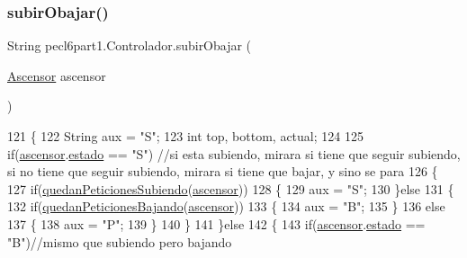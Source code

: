 \subsubsection{\texorpdfstring{subir\+Obajar()}{subirObajar()}}
{\footnotesize\ttfamily String pecl6part1.\+Controlador.\+subir\+Obajar (\begin{DoxyParamCaption}\item[{\mbox{\hyperlink{classpecl6part1_1_1_ascensor}{Ascensor}}}]{ascensor }\end{DoxyParamCaption})\hspace{0.3cm}{\ttfamily [inline]}}


\begin{DoxyCode}
121     \{
122         String aux = \textcolor{stringliteral}{"S"};
123         \textcolor{keywordtype}{int} top, bottom, actual;
124         
125         \textcolor{keywordflow}{if}(\mbox{\hyperlink{classpecl6part1_1_1_controlador_ab1a946290b47216d355b09da476486db}{ascensor}}.\mbox{\hyperlink{classpecl6part1_1_1_ascensor_ad892045a12a5bfbd5b352fede74a1d0f}{estado}} == \textcolor{stringliteral}{"S"})      \textcolor{comment}{//si esta subiendo, mirara si tiene que seguir
       subiendo, si no tiene que seguir subiendo, mirara si tiene que bajar, y sino se para}
126         \{
127             \textcolor{keywordflow}{if}(\mbox{\hyperlink{classpecl6part1_1_1_controlador_a3b5200d9999ffc177386a3e115fd65e8}{quedanPeticionesSubiendo}}(\mbox{\hyperlink{classpecl6part1_1_1_controlador_ab1a946290b47216d355b09da476486db}{ascensor}}))
128             \{
129                 aux = \textcolor{stringliteral}{"S"};
130             \}\textcolor{keywordflow}{else}
131             \{
132                 \textcolor{keywordflow}{if}(\mbox{\hyperlink{classpecl6part1_1_1_controlador_ae0f86b8248c267efc70501c7feb465b2}{quedanPeticionesBajando}}(\mbox{\hyperlink{classpecl6part1_1_1_controlador_ab1a946290b47216d355b09da476486db}{ascensor}}))
133                 \{
134                     aux = \textcolor{stringliteral}{"B"};
135                 \}
136                 \textcolor{keywordflow}{else}
137                 \{
138                     aux = \textcolor{stringliteral}{"P"};
139                 \}
140             \}
141         \}\textcolor{keywordflow}{else}
142         \{
143             \textcolor{keywordflow}{if}(\mbox{\hyperlink{classpecl6part1_1_1_controlador_ab1a946290b47216d355b09da476486db}{ascensor}}.\mbox{\hyperlink{classpecl6part1_1_1_ascensor_ad892045a12a5bfbd5b352fede74a1d0f}{estado}} == \textcolor{stringliteral}{"B"})\textcolor{comment}{//mismo que subiendo pero bajando}

\end{DoxyCode}
